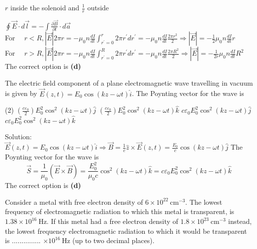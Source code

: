 \begin{enumerate}
\begin{tasks}
		\task[\textbf{D.}]$r$ inside the solenoid and $\frac{1}{r}$ outside
	\end{tasks}
	\begin{answer}
		$\oint \vec{E} \cdot d \vec{l}=-\int \frac{\partial \vec{B}}{\partial t} \cdot d \vec{a}$\\
		For $\quad r<R,|\vec{E}| 2 \pi r=-\mu_{0} n \frac{d I}{d t} \int_{r^{\prime}=0}^{r} 2 \pi r^{\prime} d r^{\prime}=-\mu_{0} n \frac{d I}{d t} \frac{2 \pi r^{2}}{2} \Rightarrow|\vec{E}|=-\frac{1}{2} \mu_{0} n \frac{d I}{d t} r$\\
		For $\quad r>R,|\vec{E}| 2 \pi r=-\mu_{0} n \frac{d I}{d t} \int_{r^{\prime}=0}^{R} 2 \pi r^{\prime} d r^{\prime}=-\mu_{0} n \frac{d I}{d t} \frac{2 \pi R^{2}}{2} \Rightarrow|\vec{E}|=-\frac{1}{2 r} \mu_{0} n \frac{d I}{d t} R^{2}$\\
		The correct option is \textbf{(d)}
	\end{answer}
	\begin{minipage}{\textwidth}
		\item The electric field component of a plane electromagnetic wave travelling in vacuum is given by $\vec{E}(z, t)=E_{0} \cos (k z-\omega t) \hat{i}$. The Poynting vector for the wave is
	\end{minipage}
	\begin{tasks}(2)
		\task[\textbf{A.}] $\left(\frac{c \varepsilon_{0}}{2}\right) E_{0}^{2} \cos ^{2}(k z-\omega t) \hat{j}$
		\task[\textbf{B.}]$\left(\frac{c \varepsilon_{0}}{2}\right) E_{0}^{2} \cos ^{2}(k z-\omega t) \hat{k}$
		\task[\textbf{C.}] $c \varepsilon_{0} E_{0}^{2} \cos ^{2}(k z-\omega t) \hat{j}$
		\task[\textbf{D.}]$c \varepsilon_{0} E_{0}^{2} \cos ^{2}(k z-\omega t) \hat{k}$
	\end{tasks}
	\begin{answer}
		Solution: $\vec{E}(z, t)=E_{0} \cos (k z-\omega t) \hat{i} \Rightarrow \vec{B}=\frac{1}{c} \hat{z} \times \vec{E}(z, t)=\frac{E_{0}}{c} \cos (k z-\omega t) \hat{j}$ The Poynting vector for the wave is
		$$
		\vec{S}=\frac{1}{\mu_{0}}(\vec{E} \times \vec{B})=\frac{E_{0}^{2}}{\mu_{0} c} \cos ^{2}(k z-\omega t) \hat{k}=c \varepsilon_{0} E_{0}^{2} \cos ^{2}(k z-\omega t) \hat{k}
		$$
		The correct option is \textbf{(d)}	
	\end{answer}
	\begin{minipage}{\textwidth}
		\item Consider a metal with free electron density of $6 \times 10^{22} \mathrm{~cm}^{-3}$. The lowest frequency of electromagnetic radiation to which this metal is transparent, is $1.38 \times 10^{16} \mathrm{~Hz}$. If this metal had a free electron density of $1.8 \times 10^{23} \mathrm{~cm}^{-3}$ instead, the lowest frequency electromagnetic radiation to which it would be transparent is ............... $\times 10^{16} \mathrm{~Hz}$ (up to two decimal places).

\end{minipage}
\end{enumerate}
